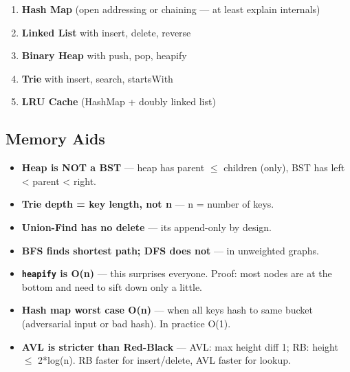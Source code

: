 \documentclass[11pt]{article}
\providecommand{\tightlist}{\setlength{\itemsep}{1pt}\setlength{\parskip}{0pt}}
\begin{document}
\begin{enumerate}
\def\labelenumi{\arabic{enumi}.}
\tightlist
\item
  \textbf{Hash Map} (open addressing or chaining --- at least explain internals)
\item
  \textbf{Linked List} with insert, delete, reverse
\item
  \textbf{Binary Heap} with push, pop, heapify
\item
  \textbf{Trie} with insert, search, startsWith
\item
  \textbf{LRU Cache} (HashMap + doubly linked list)
\end{enumerate}

\subsection{Memory Aids}\label{memory-aids}

\begin{itemize}
\tightlist
\item
  \textbf{Heap is NOT a BST} --- heap has parent \(\leq\) children (only), BST has left \textless{} parent \textless{} right.
\item
  \textbf{Trie depth = key length, not n} --- n = number of keys.
\item
  \textbf{Union-Find has no delete} --- it\textquotesingle s append-only by design.
\item
  \textbf{BFS finds shortest path; DFS does not} --- in unweighted graphs.
\item
  \textbf{\texttt{heapify} is O(n)} --- this surprises everyone. Proof: most nodes are at the bottom and need to sift down only a little.
\item
  \textbf{Hash map worst case O(n)} --- when all keys hash to same bucket (adversarial input or bad hash). In practice O(1).
\item
  \textbf{AVL is stricter than Red-Black} --- AVL: max height diff 1; RB: height \(\leq\) 2*log(n). RB faster for insert/delete, AVL faster for lookup.
\end{itemize}
\end{document}
